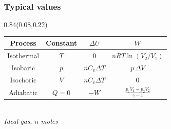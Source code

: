 \documentclass[aspectratio=169]{beamer}
\begin{document}
\begin{frame}[t]
  \frametitle{Typical values}

\begin{textblock}{0.84}(0.08,0.22)
{\setlength{\arrayrulewidth}{0.8pt} \fontsize{14}{17}\selectfont \begin{tabular}{|c|c|c|c|}
\hline
  \rowcolor{ksTH3333B3}\textcolor{ksTFFFFFFF}{\textbf{Process}} & \textcolor{ksTFFFFFFF}{\textbf{Constant}} & \textcolor{ksTFFFFFFF}{\textbf{$\Delta U$}} & \textcolor{ksTFFFFFFF}{\textbf{$W$}} \\
\hline
  Isothermal & $T$ & 0 & $nRT\ln(V_2/V_1)$ \\
\hline
  \rowcolor{ksTSEEEEF8}Isobaric & $p$ & $nC_v\Delta T$ & $p\,\Delta V$ \\
\hline
  Isochoric & $V$ & $nC_v\Delta T$ & 0 \\
\hline
  \rowcolor{ksTSEEEEF8}Adiabatic & $Q=0$ & $-W$ & $\frac{p_1V_1-p_2V_2}{\gamma-1}$ \\
\hline
\end{tabular}\\[2pt]{\footnotesize\itshape\textcolor{ksTblCap}{Ideal gas, $n$ moles}}}
\end{textblock}
\end{frame}
\end{document}
